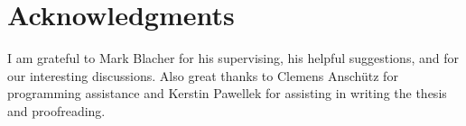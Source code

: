 \documentclass[crop=false]{standalone}
\begin{document}


  \section*{Acknowledgments}
  \thispagestyle{empty}
  I am grateful to Mark Blacher for his supervising, his helpful suggestions, and for our interesting discussions.
  Also great thanks to Clemens Anschütz for programming assistance and Kerstin Pawellek for assisting in writing the thesis and proofreading.
  \restoregeometry
\end{document}
